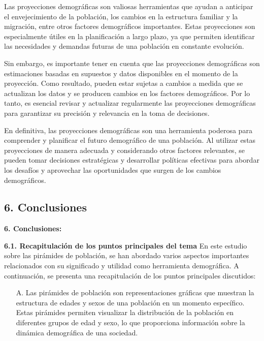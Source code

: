 \documentclass[8pt,a4paper]{beamer}
\begin{document}
{\begin{frame}{}
\begin{block}{}
Las proyecciones demográficas son valiosas herramientas que ayudan a anticipar el envejecimiento de la población, los cambios en la estructura familiar y la migración, entre otros factores demográficos importantes. Estas proyecciones son especialmente útiles en la planificación a largo plazo, ya que permiten identificar las necesidades y demandas futuras de una población en constante evolución.

Sin embargo, es importante tener en cuenta que las proyecciones demográficas son estimaciones basadas en supuestos y datos disponibles en el momento de la proyección. Como resultado, pueden estar sujetas a cambios a medida que se actualizan los datos y se producen cambios en los factores demográficos. Por lo tanto, es esencial revisar y actualizar regularmente las proyecciones demográficas para garantizar su precisión y relevancia en la toma de decisiones.

En definitiva, las proyecciones demográficas son una herramienta poderosa para comprender y planificar el futuro demográfico de una población. Al utilizar estas proyecciones de manera adecuada y considerando otros factores relevantes, se pueden tomar decisiones estratégicas y desarrollar políticas efectivas para abordar los desafíos y aprovechar las oportunidades que surgen de los cambios demográficos.
\end{block}
\end{frame}


\subsection{6. Conclusiones}
\begin{frame}{\textbf{6. Conclusiones:}}
\begin{block}{\textbf{6.1. Recapitulación de los puntos principales del tema}}
\justifying
En este estudio sobre las pirámides de población, se han abordado varios aspectos importantes relacionados con su significado y utilidad como herramienta demográfica. A continuación, se presenta una recapitulación de los puntos principales discutidos:
\begin{enumerate}
\justifying
\item[A.] Las pirámides de población son representaciones gráficas que muestran la estructura de edades y sexos de una población en un momento específico. Estas pirámides permiten visualizar la distribución de la población en diferentes grupos de edad y sexo, lo que proporciona información sobre la dinámica demográfica de una sociedad.


\end{enumerate}
\end{block}
\end{frame}}
\end{document}
